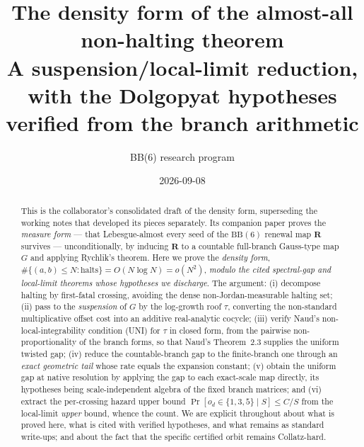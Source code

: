 \documentclass[11pt]{article}
\title{\bfseries The density form of the almost-all non-halting theorem\\[3pt]
\large A suspension/local-limit reduction, with the Dolgopyat hypotheses
verified from the branch arithmetic}
\author{BB(6) research program}
\date{2026-09-08}
\theoremstyle{definition}\newtheorem{definition}{Definition}
\theoremstyle{remark}\newtheorem{remark}{Remark}
\newcommand{\R}{\mathbf{R}}\newcommand{\Z}{\mathbb{Z}}\newcommand{\Leb}{\mathrm{Leb}}
\begin{document}
\maketitle

\begin{abstract}
This is the collaborator's consolidated draft of the density form, superseding
the working notes that developed its pieces separately. Its companion paper
proves the \emph{measure form} --- that Lebesgue-almost every seed of the
$\mathrm{BB}(6)$ renewal map $\R$ survives --- unconditionally, by inducing $\R$
to a countable full-branch Gauss-type map $G$ and applying Rychlik's theorem.
Here we prove the \emph{density form}, $\#\{(a,b)\le N:\text{halts}\}=O(N\log N)
=o(N^2)$, \emph{modulo the cited spectral-gap and local-limit theorems whose
hypotheses we discharge}. The argument: (i) decompose halting by first-fatal
crossing, avoiding the dense non-Jordan-measurable halting set; (ii) pass to the
\emph{suspension} of $G$ by the log-growth roof $\tau$, converting the
non-standard multiplicative offset cost into an additive real-analytic cocycle;
(iii) verify Naud's non-local-integrability condition (UNI) for $\tau$ in closed
form, from the pairwise non-proportionality of the branch forms, so that Naud's
Theorem~2.3 supplies the uniform twisted gap; (iv) reduce the countable-branch
gap to the finite-branch one through an \emph{exact geometric tail} whose rate
equals the expansion constant; (v) obtain the uniform gap at native resolution
by applying the gap to each exact-scale map directly, its hypotheses being
scale-independent algebra of the fixed branch matrices; and (vi) extract the
per-crossing hazard upper bound $\Pr[o_d\in\{1,3,5\}\mid S]\le C/S$ from the
local-limit \emph{upper} bound, whence the count. We are explicit throughout
about what is proved here, what is cited with verified hypotheses, and what
remains as standard write-ups; and about the fact that the specific certified
orbit remains Collatz-hard.
\end{abstract}

\tableofcontents
\end{document}
